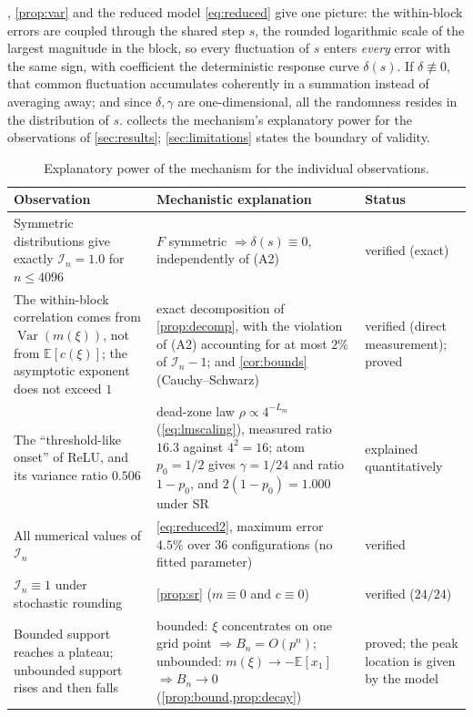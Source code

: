 \documentclass[review,hidelinks,oneeqnum,onetabnum,onefignum,onethmnum]{siamart251216}
\begin{document}
, \cref{prop:var} and the reduced model \cref{eq:reduced} give
one picture: the within-block errors are coupled through the shared step $s$, the
rounded logarithmic scale of the largest magnitude in the block, so every
fluctuation of $s$ enters \emph{every} error with the same sign, with coefficient
the deterministic response curve $\delta(s)$. If $\delta\not\equiv0$, that common
fluctuation accumulates coherently in a summation instead of averaging away; and
since $\delta,\gamma$ are one-dimensional, all the randomness resides in the
distribution of $s$.  collects the mechanism's explanatory power
for the observations of \cref{sec:results}; \cref{sec:limitations} states the
boundary of validity.

\begin{table}[!tb]
\centering
\caption{Explanatory power of the mechanism for the individual observations.}
\label{tab:explain}
\setlength{\tabcolsep}{4pt}
\footnotesize
\begin{tabular}{@{}p{}p{}p{}@{}}
\toprule
Observation & Mechanistic explanation & Status \\
\midrule
Symmetric distributions give exactly $\mathcal I_n=1.0$ for $n\le4096$ & $F$ symmetric $\Rightarrow\delta(s)\equiv0$, independently of (A2) & verified (exact) \\
The within-block correlation comes from $\operatorname{Var}(m(\xi))$, not from $\mathbb{E}[c(\xi)]$; the asymptotic exponent does not exceed $1$ & exact decomposition of \cref{prop:decomp}, with the violation of (A2) accounting for at most $2\%$ of $\mathcal I_n-1$; and \cref{cor:bounds} (Cauchy--Schwarz) & verified (direct measurement); proved \\
The ``threshold-like onset'' of ReLU, and its variance ratio $0.506$ & dead-zone law $\rho\propto4^{-L_m}$ (\cref{eq:lmscaling}), measured ratio $16.3$ against $4^2=16$; atom $p_0=1/2$ gives $\gamma=1/24$ and ratio $1-p_0$, and $2(1-p_0)=1.000$ under SR & explained quantitatively \\
All numerical values of $\mathcal I_n$ & \cref{eq:reduced2}, maximum error $4.5\%$ over $36$ configurations (no fitted parameter) & verified \\
$\mathcal I_n\equiv1$ under stochastic rounding & \cref{prop:sr} ($m\equiv0$ and $c\equiv0$) & verified ($24/24$) \\
Bounded support reaches a plateau; unbounded support rises and then falls & bounded: $\xi$ concentrates on one grid point $\Rightarrow B_n=O(p^n)$; unbounded: $m(\xi)\to-\mathbb E[x_1]$ $\Rightarrow B_n\to0$ (\cref{prop:bound,prop:decay}) & proved; the peak location is given by the model \\
\bottomrule
\end{tabular}
\end{table}
\end{document}
